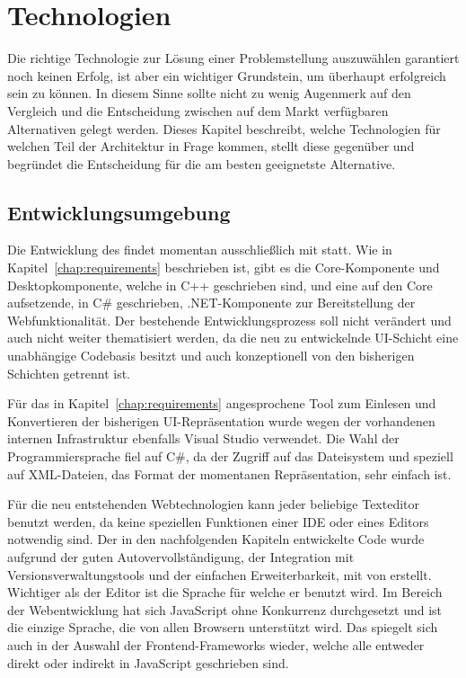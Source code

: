 \chapter{Technologien}\label{chap:technologies}

Die richtige Technologie zur Lösung einer Problemstellung auszuwählen garantiert noch keinen Erfolg, ist aber ein wichtiger Grundstein, um überhaupt erfolgreich sein zu können. In diesem Sinne sollte nicht zu wenig Augenmerk auf den Vergleich und die Entscheidung zwischen auf dem Markt verfügbaren Alternativen gelegt werden. Dieses Kapitel beschreibt, welche Technologien für welchen Teil der Architektur in Frage kommen, stellt diese gegenüber und begründet die Entscheidung für die am besten geeignetste Alternative.

\section{Entwicklungsumgebung}
Die Entwicklung des  findet momentan ausschließlich mit  statt. Wie in Kapitel~\ref{chap:requirements} beschrieben ist, gibt es die Core-Komponente und Desktopkomponente, welche in C++ geschrieben sind, und eine auf den Core aufsetzende, in C\# geschrieben, .NET-Komponente zur Bereitstellung der Webfunktionalität. Der bestehende Entwicklungsprozess soll nicht verändert und auch nicht weiter thematisiert werden, da die neu zu entwickelnde UI-Schicht eine unabhängige Codebasis besitzt und auch konzeptionell von den bisherigen Schichten getrennt ist. 

Für das in Kapitel~\ref{chap:requirements} angesprochene Tool zum Einlesen und Konvertieren der bisherigen UI-Repräsentation wurde wegen der vorhandenen internen Infrastruktur ebenfalls Visual Studio verwendet. Die Wahl der Programmiersprache fiel auf C\#, da der Zugriff auf das Dateisystem und speziell auf XML-Dateien, das Format der momentanen Repräsentation, sehr einfach ist. 

Für die neu entstehenden Webtechnologien kann jeder beliebige Texteditor benutzt werden, da keine speziellen Funktionen einer IDE oder eines Editors notwendig sind. Der in den nachfolgenden Kapiteln entwickelte Code wurde aufgrund der guten Autovervollständigung, der Integration mit Versionsverwaltungstools und der einfachen Erweiterbarkeit, mit  von  erstellt. Wichtiger als der Editor ist die Sprache für welche er benutzt wird. Im Bereich der Webentwicklung hat sich JavaScript ohne Konkurrenz durchgesetzt und ist die einzige Sprache, die von allen Browsern unterstützt wird. Das spiegelt sich auch in der Auswahl der Frontend-Frameworks wieder, welche alle entweder direkt oder indirekt in JavaScript geschrieben sind.   

